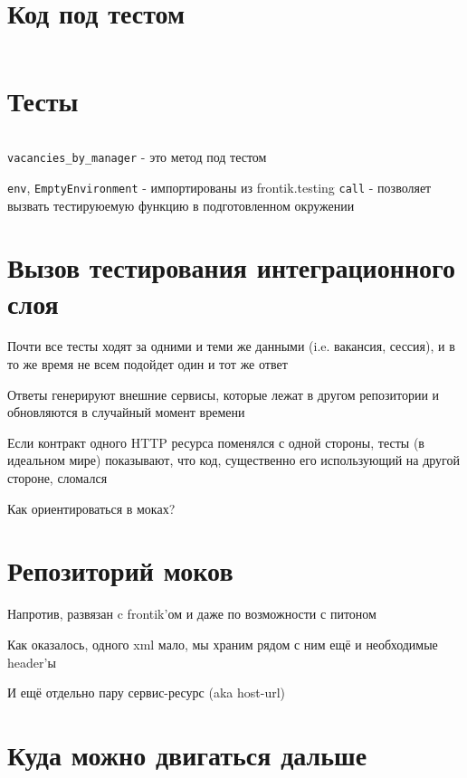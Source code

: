 \documentclass[12pt]{article}
\begin{document}
\section{Код под тестом}
\small
\inputminted[linenos=true]{python}{code.py}

\section{Тесты}

\small
\inputminted[linenos=true]{python}{test.py}

\verb+vacancies_by_manager+ - это метод под тестом

\verb+env+, \verb+EmptyEnvironment+ - импортированы из frontik.testing
\verb+call+ - позволяет вызвать тестируюемую функцию в подготовленном окружении

\section{Вызов тестирования интеграционного слоя}

Почти все тесты ходят за одними и теми же данными (i.e. вакансия, сессия), и в то же время не всем подойдет один и тот же ответ

Ответы генерируют внешние сервисы, которые лежат в другом репозитории и обновляются в случайный момент времени

Если контракт одного HTTP ресурса поменялся с одной стороны, тесты (в идеальном мире) показывают, что код, существенно его использующий на другой стороне, сломался

Как ориентироваться в моках?

\section{Репозиторий моков}

Напротив, развязан c frontik'ом и даже по возможности с питоном

Как оказалось, одного xml мало, мы храним рядом с ним ещё и необходимые header'ы

И ещё отдельно пару сервис-ресурс (aka host-url)

\section{Куда можно двигаться дальше}
\end{document}
